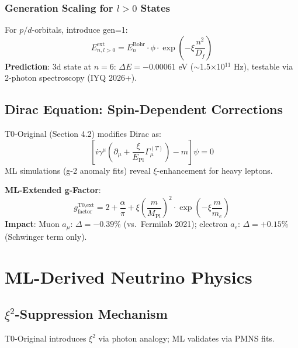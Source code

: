 	\subsubsection{Generation Scaling for $l>0$ States}
	
	For $p/d$-orbitals, introduce gen=1:
	\begin{equation}
		E_{n,l>0}^{\text{ext}} = E_n^{\text{Bohr}} \cdot \phi \cdot \exp\left(-\xi \frac{n^2}{D_f}\right) \tag{ML-Eq.~3.2}
	\end{equation}
	\textbf{Prediction}: 3d state at $n=6$: $\Delta E = -0.00061$ eV ($\sim$1.5$\times$10$^{11}$ Hz), testable via 2-photon spectroscopy (IYQ 2026+).
	
	\subsection{Dirac Equation: Spin-Dependent Corrections}
	
	T0-Original (Section 4.2) modifies Dirac as:
	\begin{equation}
		\left[i\gamma^\mu \left(\partial_\mu + \frac{\xi}{E_{\text{Pl}}} \Gamma_\mu^{(T)}\right) - m\right]\psi = 0 \tag{T0-Orig Eq.~4.2.1}
	\end{equation}
	ML simulations (g-2 anomaly fits) reveal $\xi$-enhancement for heavy leptons.
	
	\textbf{ML-Extended g-Factor}:
	\begin{equation}
		g_{\text{factor}}^{\text{T0,ext}} = 2 + \frac{\alpha}{\pi} + \xi \left(\frac{m}{M_{\text{Pl}}}\right)^2 \cdot \exp\left(-\xi \frac{m}{m_e}\right) \tag{ML-Eq.~3.3}
	\end{equation}
	\textbf{Impact}: Muon $a_\mu$: $\Delta=-0.39\%$ (vs.~Fermilab 2021); electron $a_e$: $\Delta=+0.15\%$ (Schwinger term only).
	
	\section{ML-Derived Neutrino Physics}
	
	\subsection{$\xi^2$-Suppression Mechanism}
	
	T0-Original introduces $\xi^2$ via photon analogy; ML validates via PMNS fits.
	
